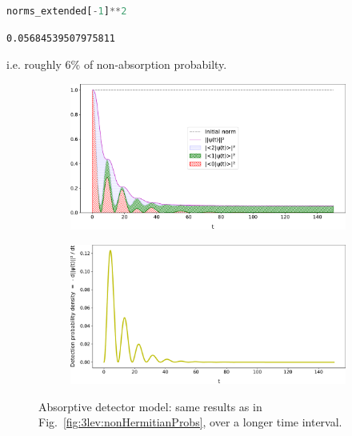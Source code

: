\begin{lstlisting}[language=Python]
norms_extended[-1]**2
\end{lstlisting}
\begin{lstlisting}
0.05684539507975811
\end{lstlisting}
i.e. roughly 6\% of non-absorption probabilty.
%
\begin{figure}[]
  \begin{subfigure}[b]{\textwidth}
    \centering
    \includegraphics[width=\textwidth]{img/3ldetect/loss3color_ext.pdf}
    \label{fig:3lev:loss3color_ext}
  \end{subfigure}
  \par\bigskip
  \par\bigskip
  \begin{subfigure}[b]{\textwidth}
    \centering
    \includegraphics[width=\textwidth]{img/3ldetect/loss_ext.pdf}
    \label{fig:3lev:loss_ext}
  \end{subfigure}
  \par\bigskip
  \par\bigskip
  \caption{
    Absorptive detector model: same results as in Fig.~\ref{fig:3lev:nonHermitianProbs},
    over a longer time interval.
  }
  \label{fig:3lev:nonHermitianProbs_ext}
\end{figure}

